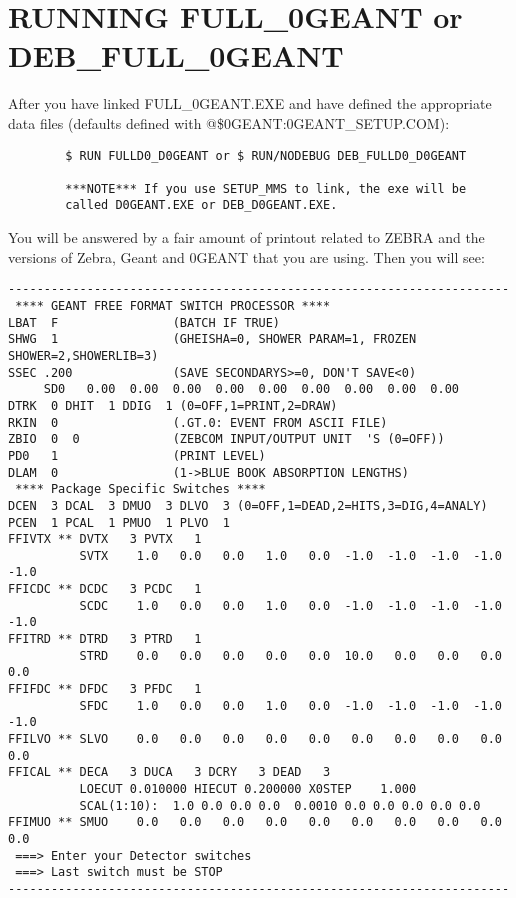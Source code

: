 \section{RUNNING FULL\_\D0GEANT or DEB\_FULL\_\D0GEANT}
\label{running}

After you have linked FULL\_\D0GEANT.EXE and have defined the appropriate
data files (defaults defined with @\$\D0GEANT:\D0GEANT\_SETUP.COM): 

\begin{verbatim}
        $ RUN FULLD0_D0GEANT or $ RUN/NODEBUG DEB_FULLD0_D0GEANT

        ***NOTE*** If you use SETUP_MMS to link, the exe will be
        called D0GEANT.EXE or DEB_D0GEANT.EXE.
\end{verbatim}

You will be answered by a fair amount of printout related to ZEBRA and
the versions of Zebra, Geant and \D0GEANT that you are using. Then you will see:

\begin{verbatim}
----------------------------------------------------------------------
 **** GEANT FREE FORMAT SWITCH PROCESSOR ****
LBAT  F                (BATCH IF TRUE)
SHWG  1                (GHEISHA=0, SHOWER PARAM=1, FROZEN SHOWER=2,SHOWERLIB=3)
SSEC .200              (SAVE SECONDARYS>=0, DON'T SAVE<0)
     SD0   0.00  0.00  0.00  0.00  0.00  0.00  0.00  0.00  0.00
DTRK  0 DHIT  1 DDIG  1 (0=OFF,1=PRINT,2=DRAW)
RKIN  0                (.GT.0: EVENT FROM ASCII FILE)
ZBIO  0  0             (ZEBCOM INPUT/OUTPUT UNIT  'S (0=OFF))
PD0   1                (PRINT LEVEL)
DLAM  0                (1->BLUE BOOK ABSORPTION LENGTHS)
 **** Package Specific Switches ****
DCEN  3 DCAL  3 DMUO  3 DLVO  3 (0=OFF,1=DEAD,2=HITS,3=DIG,4=ANALY)
PCEN  1 PCAL  1 PMUO  1 PLVO  1
FFIVTX ** DVTX   3 PVTX   1
          SVTX    1.0   0.0   0.0   1.0   0.0  -1.0  -1.0  -1.0  -1.0  -1.0
FFICDC ** DCDC   3 PCDC   1
          SCDC    1.0   0.0   0.0   1.0   0.0  -1.0  -1.0  -1.0  -1.0  -1.0
FFITRD ** DTRD   3 PTRD   1
          STRD    0.0   0.0   0.0   0.0   0.0  10.0   0.0   0.0   0.0   0.0
FFIFDC ** DFDC   3 PFDC   1
          SFDC    1.0   0.0   0.0   1.0   0.0  -1.0  -1.0  -1.0  -1.0  -1.0
FFILVO ** SLVO    0.0   0.0   0.0   0.0   0.0   0.0   0.0   0.0   0.0   0.0
FFICAL ** DECA   3 DUCA   3 DCRY   3 DEAD   3
          LOECUT 0.010000 HIECUT 0.200000 X0STEP    1.000
          SCAL(1:10):  1.0 0.0 0.0 0.0  0.0010 0.0 0.0 0.0 0.0 0.0
FFIMUO ** SMUO    0.0   0.0   0.0   0.0   0.0   0.0   0.0   0.0   0.0   0.0
 ===> Enter your Detector switches
 ===> Last switch must be STOP
----------------------------------------------------------------------
\end{verbatim}

